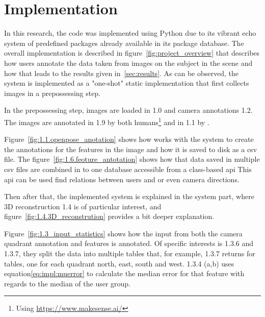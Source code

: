 \section{Implementation}
\label{sec:work}

In this research, the code was implemented using Python due to its vibrant echo system of predefined packages already available in its package database.
The overall implementation is described in figure~\ref{fig:project_overview} that describes how users annotate the data taken from images on the subject in the scene and how that leads to the results given in~\ref{sec:results}.
As can be observed, the system is implemented as a "one-shot" static implementation that first collects images in a prepossessing step.

In the prepossessing step, images are loaded in 1.0 and camera annotations 1.2.
The images are annotated in 1.9 by both humans\footnote{Using \url{https://www.makesense.ai/}} and in 1.1 by \openpose{ }.

Figure~\ref{fig:1.1.openpose_anotation} shows how \openpose{ } works with the system to create the annotations for the features in the image and how it is saved to disk as a \ac{csv} file.
The figure~\ref{fig:1.6.feoture_antotation} shows how that data saved in multiple \ac{csv} files are combined in to one database accessible from a class-based \ac{api}
This \ac{api} can be used find relations between users and \openpose{ } or even camera directions.

Then after that, the implemented system is explained in the system part, where 3D reconstruction 1.4 is of particular interest, and figure~\ref{fig:1.4.3D_reconstrution} provides a bit deeper explanation.

Figure~\ref {fig:1.3_input_statistics} shows how the input from both the camera quadrant annotation and features is annotated.
Of specific interests is 1.3.6 and 1.3.7, they split the data into multiple tables that, for example, 1.3.7 returns for tables, one for each quadrant north, east, south and west.
1.3.4 (a,b) uses equation\ref{eq:impl:muerror} to calculate the median error for that feature with regards to the median of the user group.




